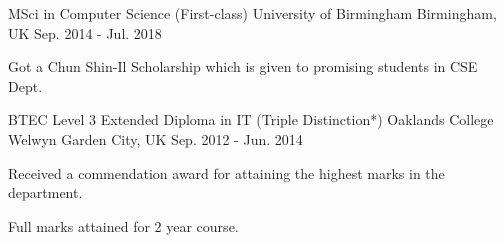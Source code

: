 

\begin{cventries}

  \cventry
  {MSci in Computer Science (First-class)} %
    {University of Birmingham} %
    {Birmingham, UK} %
    {Sep. 2014 - Jul. 2018} %
    {
      \begin{cvitems} %
        \item {Got a Chun Shin-Il Scholarship which is given to promising students in CSE Dept.}
      \end{cvitems}
    }

  \cventry
  {BTEC Level 3 Extended Diploma in IT (Triple Distinction*)} %
    {Oaklands College} %
    {Welwyn Garden City, UK} %
    {Sep. 2012 - Jun. 2014} %
    {
      \begin{cvitems} %
        \item {Received a commendation award for attaining the highest marks in the department.}
        \item {Full marks attained for 2 year course.}
      \end{cvitems}
    }

\end{cventries}
